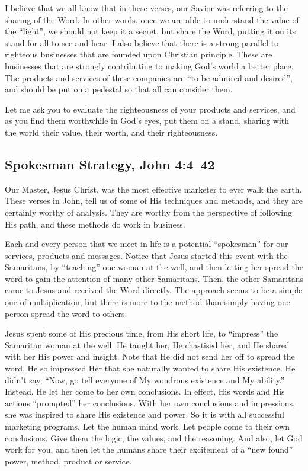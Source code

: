 \documentclass[12pt]{memoir}
\begin{document}
I believe that we all know that in these verses, our Savior was referring
to the sharing of the Word. In other words, once we are able to understand
the value of the ``light'', we should not keep it a secret, but
share the Word, putting it on its stand for all to see and hear. I
also believe that there is a strong parallel to righteous businesses
that are founded upon Christian principle. These are businesses that
are strongly contributing to making God's world a better place. The
products and services of these companies are ``to be admired and
desired'', and should be put on a pedestal so that all can consider
them. 

Let me ask you to evaluate the righteousness of your products and
services, and as you find them worthwhile in God's eyes, put them
on a stand, sharing with the world their value, their worth, and their
righteousness.  

\subsection{Spokesman Strategy, John 4:4--42}

Our Master, Jesus Christ, was the most effective marketer to ever
walk the earth. These verses in John, tell us of some of His techniques
and methods, and they are certainly worthy of analysis. They are worthy
from the perspective of following His path, and these methods do work
in business. 

Each and every person that we meet in life is a potential ``spokesman''
for our services, products and messages. Notice that Jesus started
this event with the Samaritans, by ``teaching'' one woman at the
well, and then letting her spread the word to gain the attention of
many other Samaritans. Then, the other Samaritans came to Jesus and
received the Word directly. The approach seems to be a simple one
of multiplication, but there is more to the method than simply having
one person spread the word to others.

Jesus spent some of His precious time, from His short life, to ``impress''
the Samaritan woman at the well. He taught her, He chastised her,
and He shared with her His power and insight. Note that He did not
send her off to spread the word. He so impressed Her that she naturally
wanted to share His existence. He didn't say, ``Now, go tell everyone
of My wondrous existence and My ability.'' Instead, He let her come
to her own conclusions. In effect, His words and His actions ``prompted''
her conclusions. With her own conclusions and impressions, she was
inspired to share His existence and power. So it is with all successful
marketing programs. Let the human mind work. Let people come to their
own conclusions. Give them the logic, the values, and the reasoning.
And also, let God work for you, and then let the humans share their
excitement of a ``new found'' power, method, product or service.
\end{document}
